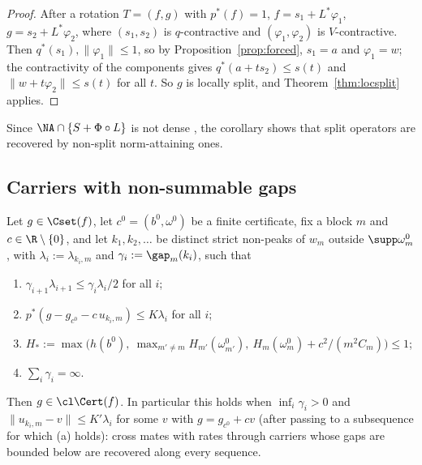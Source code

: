 \begin{proof}
After a rotation $T=(f,g)$ with $p^*(f)=1$, $f=s_1+L^*\varphi_1$,
$g=s_2+L^*\varphi_2$, where $(s_1,s_2)$ is $q$-contractive and
$(\varphi_1,\varphi_2)$ is $V$-contractive.  Then $q^*(s_1),\|\varphi_1\|\le
1$, so by Proposition~\ref{prop:forced}, $s_1=a$ and $\varphi_1=w$; the
contractivity of the components gives $q^*(a+ts_2)\le s(t)$ and
$\|w+t\varphi_2\|\le s(t)$ for all $t$.  So $g$ is locally split, and
Theorem~\ref{thm:locsplit} applies.
\end{proof}

Since $\NA\cap\{S+\Phi\circ L\}$ is not dense \cite[Section~3]{PrA}, the
corollary shows that split operators are recovered by non-split
norm-attaining ones.

\subsection{Carriers with non-summable gaps}

\begin{theorem}\label{thm:carriers}
Let $g\in\Cset(f)$, let $c^0=(b^0,\omega^0)$ be a finite certificate, fix a
block $m$ and $c\in\R\setminus\{0\}$, and let $k_1,k_2,\dots$ be distinct
strict non-peaks of $w_m$ outside $\supp\omega^0_m$, with
$\lambda_i:=\lambda_{k_i,m}$ and $\gamma_i:=\gap_m(k_i)$, such that
\begin{enumerate}
\item[(a)] $\gamma_{i+1}\lambda_{i+1}\le\gamma_i\lambda_i/2$ for all $i$;
\item[(b)] $p^*(g-g_{c^0}-c\,u_{k_i,m})\le K\lambda_i$ for all $i$;
\item[(c)] $H_*:=\max\big(h(b^0),\ \max_{m'\ne m}H_{m'}(\omega^0_{m'}),\
H_m(\omega^0_m)+c^2/(m^2C_m)\big)\le1$;
\item[(d)] $\sum_i\gamma_i=\infty$.
\end{enumerate}
Then $g\in\cl\Cert(f)$.  In particular this holds when $\inf_i\gamma_i>0$
and $\|u_{k_i,m}-v\|\le K'\lambda_i$ for some $v$ with $g=g_{c^0}+cv$
\textup{(}after passing to a subsequence for which \textup{(a)}
holds\textup{)}: cross mates with rates through carriers whose gaps are
bounded below are recovered along every sequence.
\end{theorem}

